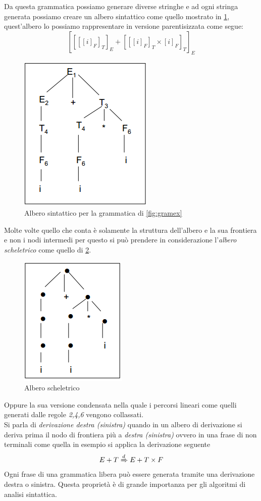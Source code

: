 Da questa grammatica possiamo generare diverse stringhe e ad ogni stringa generata possiamo creare un albero sintattico come quello mostrato in \figurename \ref{fig:sintree}, quest'albero lo possiamo rappresentare in versione parentisizzata come segue:
$$[[[[i]_F]_T]_E+[[[i]_F]_T\times [i]_F]_T]_E$$
\begin{figure}
	\centering
	\includegraphics[width=0.32\linewidth]{img/sintree.png}
	\caption{Albero sintattico per la grammatica di \figurename \ref{fig:gramex}}\label{fig:sintree}
\end{figure}
Molte volte quello che conta è solamente la struttura dell'albero e la sua frontiera e non i nodi intermedi per questo si può prendere in considerazione l'\emph{albero scheletrico} come quello di \figurename \ref{fig:skeletont}. 
\begin{figure}
	\centering
	\includegraphics[width=0.32\linewidth]{img/skeletont.png}
	\caption{Albero scheletrico}\label{fig:skeletont}
\end{figure}
Oppure la sua versione condensata nella quale i percorsi lineari come quelli generati dalle regole \emph{2,4,6} vengono collassati.\\
Si parla di \emph{derivazione destra (sinistra)} quando in un albero di derivazione si deriva prima il nodo di frontiera più a \emph{destra (sinistra)} ovvero in una frase di non terminali come quella in esempio si applica la derivazione seguente
$$E+T\xRightarrow{d}E+T\times F$$
Ogni frase di una grammatica libera può essere generata tramite una derivazione destra o sinistra. Questa proprietà è di grande importanza per gli  algoritmi di analisi sintattica.\\
